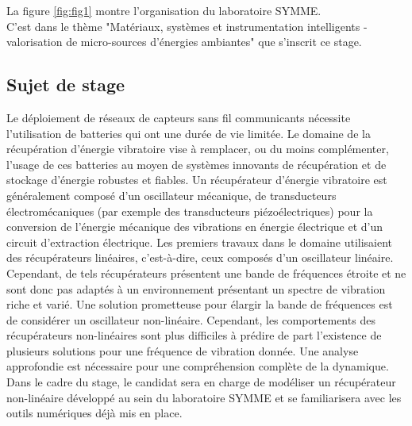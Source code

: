 \documentclass[a4paper, french, 12pt, titlepage]{article}
\begin{document}
La figure \ref{fig:fig1} montre l'organisation du laboratoire SYMME. \\

C'est dans le thème "Matériaux, systèmes et instrumentation intelligents - valorisation de micro-sources d'énergies ambiantes" que s'inscrit ce stage. 

\subsection{Sujet de stage}

Le déploiement de réseaux de capteurs sans fil communicants nécessite l’utilisation de batteries qui ont une durée de vie limitée. Le domaine de la récupération d’énergie vibratoire vise à remplacer, ou du moins complémenter, l’usage de ces batteries au moyen de systèmes innovants de récupération et de stockage d’énergie robustes et fiables. Un récupérateur d’énergie vibratoire est généralement composé d’un oscillateur mécanique, de transducteurs électromécaniques (par exemple des transducteurs piézoélectriques) pour la conversion de l’énergie mécanique des vibrations en énergie électrique et d’un circuit d’extraction électrique. Les premiers travaux dans le domaine utilisaient des récupérateurs linéaires, c’est-à-dire, ceux composés d’un oscillateur linéaire. Cependant, de tels récupérateurs présentent une bande de fréquences étroite et ne sont donc pas adaptés à un environnement présentant un spectre de vibration riche et varié. Une solution prometteuse pour élargir la bande de fréquences est de considérer un oscillateur non-linéaire. Cependant, les comportements des récupérateurs non-linéaires sont plus difficiles à prédire de part l’existence de plusieurs solutions pour une fréquence de vibration donnée. Une analyse approfondie est nécessaire pour une compréhension complète de la dynamique. Dans le cadre du stage, le candidat sera en charge de modéliser un récupérateur non-linéaire développé au sein du laboratoire SYMME et se familiarisera avec les outils numériques déjà mis en place.\\
\end{document}
